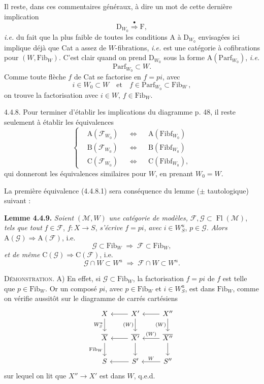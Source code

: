 \documentclass[11pt]{article}
\newcommand{\printedpage}[1]{\marginpar{\footnotesize p.~#1}}
\newcommand{\msp}[1]{\marginpar{\footnotesize [#1]}}
\newcommand{\Fl}{\operatorname{Fl}}
\newcommand{\Fib}{\mathrm{Fib}}
\newcommand{\Fibf}{\mathrm{Fibf}}
\newcommand{\Parf}{\mathrm{Parf}}
\newcommand{\dotimp}{\overset{\bullet}{\Longrightarrow}}
\begin{document}
Il reste, dans ces commentaires généraux, à dire un mot de cette dernière implication
\[
\mathrm{D}_{W_0} \dotimp \mathrm{F},
\]
\textit{i.e.} du fait que la plus faible de toutes les conditions A à $\mathrm{D}_{W_0}$ envisagées ici implique déjà que Cat a assez de $W$-fibrations, \textit{i.e.} est une catégorie à cofibrations pour $(W, \Fib_W)$. C'est clair quand on prend $\mathrm{D}_{W_0}$ sous la forme $\mathrm{A}(\Parf_{W_0})$, \textit{i.e.}
\[
\Parf_{W_0} \subset W.
\]
Comme toute flèche $f$ de Cat se factorise en $f = pi$, avec
\[
i \in W_0 \subset W \quad\text{et}\quad f \in \Parf_{W_0} \subset \Fib_W\, , %
\]
on trouve la factorisation avec $i \in W$, $f \in \Fib_W$. %

\msp{page 51}
4.4.8. Pour terminer d'établir les implications du diagramme p. 48, il reste seulement à établir les équivalences
\[
\left\{
\begin{aligned}
&\mathrm{A}(\mathcal{F}_{W_0}) &&\Longleftrightarrow &&\mathrm{A}(\Fibf_{W_0})\\
&\mathrm{B}(\mathcal{F}_{W_0}) &&\Longleftrightarrow &&\mathrm{B}(\Fibf_{W_0})\\
&\mathrm{C}(\mathcal{F}_{W_0}) &&\Longleftrightarrow &&\mathrm{C}(\Fibf_{W_0}),
\end{aligned}
\right.
\tag*{(4.4.8.1)}
\]
qui donneront les équivalences similaires pour $W$, en prenant $W_0 = W$.

La première équivalence (4.4.8.1) sera conséquence du lemme ($\pm$ tautologique) suivant :

\textbf{Lemme 4.4.9.} \textit{Soient} $(\mathcal{M}, W)$ \textit{une catégorie de modèles,} $\mathcal{F}, \mathcal{G} \subset \Fl(\mathcal{M})$, \textit{tels que tout} $f \in \mathcal{F}$, $f : X \longrightarrow S$, \textit{s'écrive} $f = pi$, \textit{avec} $i \in W^u_S$, $p \in \mathcal{G}$. \textit{Alors} $\mathrm{A}(\mathcal{G}) \Longrightarrow \mathrm{A}(\mathcal{F})$, i.e.
\[
\mathcal{G} \subset \Fib_W \;\Longrightarrow\; \mathcal{F} \subset \Fib_W,
\tag*{(4.4.9.1)}
\]
\textit{et de même} $\mathrm{C}(\mathcal{G}) \Longrightarrow \mathrm{C}(\mathcal{F})$, i.e.
\[
\mathcal{G} \cap W \subset W^u \;\Longrightarrow\; \mathcal{F} \cap W \subset W^u.
\tag*{(4.4.9.2)}
\]

\textsc{Démonstration}. A) En effet, si $\mathcal{G} \subset \Fib_W$, la factorisation $f = pi$ de $f$ est telle que $p \in \Fib_W$. Or un composé $pi$, avec $p \in \Fib_W$ et $i \in W^{\mathrm{u}}_S$, est dans $\Fib_W$, comme on vérifie aussitôt sur le diagramme de carrés cartésiens
\printedpage{30}
\[
\begin{tikzcd}
X \arrow[d, "W^{\mathrm{u}}_S"'] & X' \arrow[l] \arrow[d, "(W)"'] & X'' \arrow[l] \arrow[d, "(W)"'] \\
\overline{X} \arrow[d, "\Fib_W"'] & \overline{X'} \arrow[l] \arrow[d] & \overline{X''} \arrow[l, "(W)"'] \arrow[d] \\
S & S' \arrow[l] & S'' \arrow[l, "W"']
\end{tikzcd}
\]
sur lequel on lit que $X'' \longrightarrow X'$ est dans $W$, q.e.d.
\end{document}
